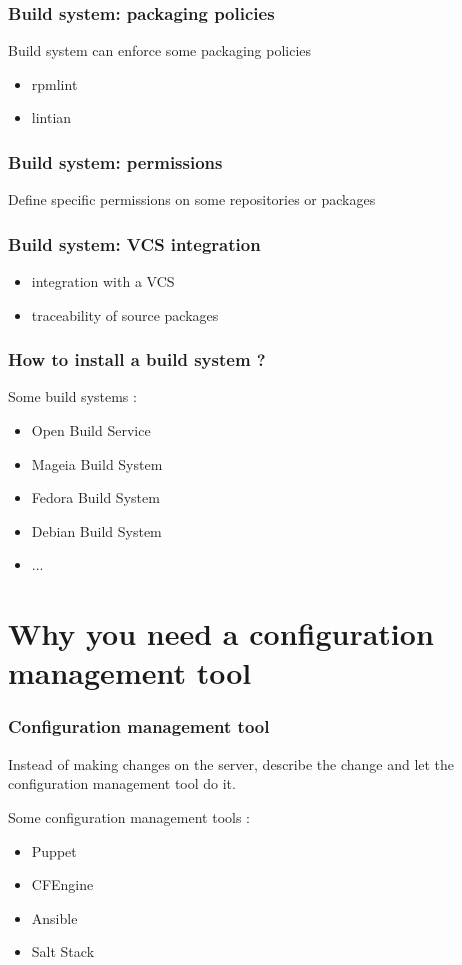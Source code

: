 \documentclass{beamer}
\begin{document}
\begin{frame}
  \frametitle{Build system: packaging policies}

  Build system can enforce some packaging policies

  \begin{itemize}
    \item rpmlint
    \item lintian
  \end{itemize}
\end{frame}

\begin{frame}
  \frametitle{Build system: permissions}

  Define specific permissions on some repositories or packages
\end{frame}

\begin{frame}
  \frametitle{Build system: VCS integration}
  
  \begin{itemize}
    \item integration with a VCS
    \item traceability of source packages
  \end{itemize}
\end{frame}

\begin{frame}
  \frametitle{How to install a build system ?}

  Some build systems :
  \begin{itemize}
    \item Open Build Service
    \item Mageia Build System
    \item Fedora Build System
    \item Debian Build System
    \item ...
  \end{itemize}
\end{frame}

\section{Why you need a configuration management tool}

\begin{frame}
  \frametitle{Configuration management tool}
  Instead of making changes on the server, describe the change and
  let the configuration management tool do it.

  Some configuration management tools :
  \begin{itemize}
    \item Puppet
    \item CFEngine
    \item Ansible
    \item Salt Stack
  \end{itemize}
\end{frame}
\end{document}
